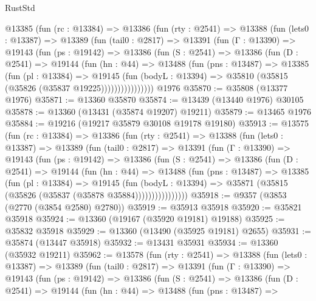 \begin{lexlean}{RustStd}
\begin{coremodule}
    @13385
      (fun (rc : @13384) =>
      @13386
        (fun (rty : @2541) =>
        @13388
          (fun (lets0 : @13387) =>
          @13389
            (fun (tail0 : @2817) =>
            @13391
              (fun (Γ : @13390) =>
              @19143
                (fun (ps : @19142) =>
                @13386
                  (fun (S : @2541) =>
                  @13386
                    (fun (D : @2541) =>
                    @19144
                      (fun (hn : @44) =>
                      @13488
                        (fun (pns : @13487) =>
                        @13385
                          (fun (pl : @13384) =>
                          @19145
                            (fun (bodyL : @13394) =>
                            @35810 (@35815 (@35826 (@35837 @19225))))))))))))))))
    @1976
@35870 := @35808 (@13377 @1976)
@35871 := @13360 @35870
@35874 := @13439 (@13440 @1976) @30105
@35878 := @13360 (@13431 (@35874 @19207) @19211)
@35879 := @13465 @1976
@35884 := @19216 (@19217 @35879 @30108 @19178 @19180)
@35913 := @13575
    (fun (rc : @13384) =>
    @13386
      (fun (rty : @2541) =>
      @13388
        (fun (lets0 : @13387) =>
        @13389
          (fun (tail0 : @2817) =>
          @13391
            (fun (Γ : @13390) =>
            @19143
              (fun (ps : @19142) =>
              @13386
                (fun (S : @2541) =>
                @13386
                  (fun (D : @2541) =>
                  @19144
                    (fun (hn : @44) =>
                    @13488
                      (fun (pns : @13487) =>
                      @13385
                        (fun (pl : @13384) =>
                        @19145
                          (fun (bodyL : @13394) =>
                          @35871 (@35815 (@35826 (@35837 (@35878 @35884))))))))))))))))
@35918 := @9357 (@3853 (@2770 (@3854 @2580) @2780))
@35919 := @35913 @35918
@35920 := @35821 @35918
@35924 := @13360 (@19167 (@35920 @19181) @19188)
@35925 := @35832 @35918
@35929 := @13360 (@13490 (@35925 @19181) @2655)
@35931 := @35874 (@13447 @35918)
@35932 := @13431 @35931
@35934 := @13360 (@35932 @19211)
@35962 := @13578
    (fun (rty : @2541) =>
    @13388
      (fun (lets0 : @13387) =>
      @13389
        (fun (tail0 : @2817) =>
        @13391
          (fun (Γ : @13390) =>
          @19143
            (fun (ps : @19142) =>
            @13386
              (fun (S : @2541) =>
              @13386
                (fun (D : @2541) =>
                @19144
                  (fun (hn : @44) =>
                  @13488
                    (fun (pns : @13487) =>

\end{coremodule}
\end{lexlean}
